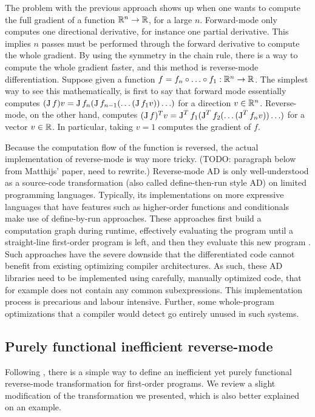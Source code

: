 The problem with the previous approach shows up when one wants to compute the full gradient of a function $\mathbb{R}^n\to\mathbb{R}$, for a large $n$. 
Forward-mode only computes one directional derivative, for instance one partial derivative. This implies $n$ passes must be performed through the forward derivative to compute the whole gradient.
By using the symmetry in the chain rule, there is a way to compute the whole gradient faster, and this method is reverse-mode differentiation.
Suppose given a function $f=f_n\circ\ldots\circ f_1 :\mathbb{R}^n\to\mathbb{R}$. 
The simplest way to see this mathematically, is first to say that forward mode essentially computes $(\operatorname{J} f)v=\operatorname{J} f_n(\operatorname{J} f_{n-1}(\ldots(\operatorname{J} f_1v))\ldots)$ for a direction $v\in\mathbb{R}^n$. 
Reverse-mode, on the other hand, computes $(\operatorname{J} f)^Tv = \operatorname{J}^Tf_1(\operatorname{J}^T f_{2}(\ldots(\operatorname{J}^T f_nv))\ldots)$ for a vector $v\in\mathbb{R}$.
In particular, taking $v=1$ computes the gradient of $f$.

Because the computation flow of the function is reversed, the actual implementation of reverse-mode is way more tricky. 
(TODO: paragraph below from Matthijs' paper, need to rewrite.)
Reverse-mode AD is only well-understood as a source-code transformation 
(also called define-then-run style AD) on limited programming languages. 
Typically, its implementations on more expressive languages that have features such as higher-order functions and conditionals
make use of define-by-run approaches. 
These approaches first build a computation graph during runtime, effectively evaluating the program until a straight-line
first-order program is left, and then they evaluate this new program \cite{carpenter2015stan,paszke2017automatic}. 
Such approaches have the severe downside that the differentiated code cannot benefit from existing optimizing compiler architectures. 
As such, these AD libraries need to be implemented using carefully, manually optimized code, that for example does not contain any common subexpressions. 
This implementation process is precarious and labour intensive. 
Further, some whole-program optimizations that a compiler would detect go entirely unused in such systems.

\subsection{Purely functional inefficient reverse-mode}

Following \cite{pearlmutter2008reverse}, there is a simple way to define an inefficient yet purely functional reverse-mode transformation for first-order programs.
We review a slight modification of the transformation we presented, which is also better explained on an example. 

